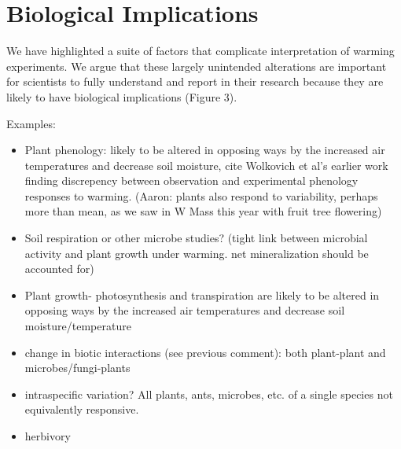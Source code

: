 \documentclass{article}
\begin{document}
\section {Biological Implications}
\par We have highlighted a suite of factors that complicate   interpretation of warming experiments. We argue that these largely unintended alterations are important for scientists to fully understand and report in their research because they are likely to have biological implications (Figure 3).
\par Examples:
\begin{itemize}
\item Plant phenology: likely to be altered in opposing ways by
the increased air temperatures and decrease soil moisture, cite Wolkovich et al's earlier work finding discrepency between observation and experimental phenology responses to warming. (Aaron: plants also respond to variability, perhaps more than mean, as we saw in W Mass this year with fruit tree flowering)
\item Soil respiration or other microbe studies? (tight link between microbial activity and plant growth under warming. net mineralization should be accounted for)
\item Plant growth- photosynthesis and transpiration are likely to be altered in opposing ways by the increased air temperatures and decrease soil moisture/temperature %
\item change in biotic interactions (see previous comment): both plant-plant and microbes/fungi-plants
\item intraspecific variation? All plants, ants, microbes, etc. of a single species not equivalently responsive. 
\item herbivory
\end{itemize}
\end{document}
